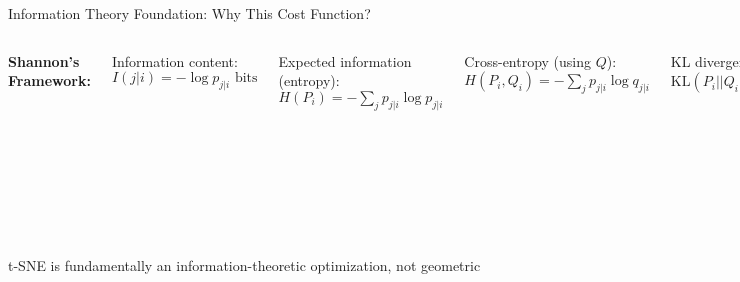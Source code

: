 \documentclass[aspectratio=169]{beamer}
\begin{document}
\begin{frame}{Information Theory Foundation: Why This Cost Function?}
\begin{columns}
\textbf{Shannon's Framework:}

Information content:
$I(j|i) = -\log p_{j|i} \text{ bits}$

Expected information (entropy):
$H(P_i) = -\sum_j p_{j|i}\log p_{j|i}$

Cross-entropy (using $Q$):
$H(P_i, Q_i) = -\sum_j p_{j|i}\log q_{j|i}$

KL divergence (extra bits):
$\text{KL}(P_i||Q_i) = \sum_j p_{j|i}\log\frac{p_{j|i}}{q_{j|i}}$

\textbf{Asymmetry Matters:}


\vspace{0.2cm}
\textbf{Critical Design Choice:}

Missing true neighbor (top): 29× penalty vs false neighbor (bottom)

This asymmetry prioritizes local structure preservation
\end{columns}

\vspace{0.3cm}
\colorbox{green!20}{\parbox{0.95\textwidth}{\centering t-SNE is fundamentally an information-theoretic optimization, not geometric}}
\end{frame}
\end{document}
